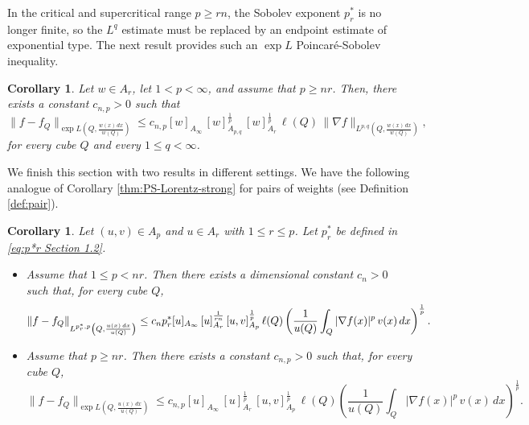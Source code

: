 \documentclass[reqno, 10pt, oneside]{amsart}
\numberwithin{equation}{section}
\newcommand{\strt}[1]{\rule{0pt}{#1}}
\newtheorem{corollary}[theorem]{Corollary}
\numberwithin{theorem}{section}
\newcommand{\1}{{\rm 1\hspace*{-0.4ex}%
\rule{0.1ex}{1.52ex}\hspace*{0.2ex}}}
\begin{document}
In the critical and supercritical range $p\ge rn$, the Sobolev exponent $p_r^{*}$ is no longer finite, so the $L^q$ estimate must be replaced by an endpoint estimate of exponential type. The next result provides such an $\exp L$ Poincaré-Sobolev inequality. 

\begin{corollary}\label{thm:PS-exp}
Let $w\in A_r$, let $1<p<\infty$, and assume that $p\ge nr$. Then, there exists a constant $c_{n,p}>0$ such that
\begin{equation}\label{eq:PS-exp}
	\|f-f_Q\|_{\exp L\left(Q, \frac{w(x)\,dx}{w(Q)}\right)} \le c_{n,p} [w]_{A_\infty}\,[w]_{A_{p,q}}^{\frac{1}{p}}\,[w]_{A_r}^{\frac{1}{p}}\, \ell(Q)\,\|\nabla f\|_{L^{p,q}\left(Q,\frac{w(x)\,dx}{w(Q)}\right)},
\end{equation}
for every cube $Q$ and every $1 \le q<\infty$.  
\end{corollary}



We finish this section with two results in different settings. We have the following analogue of Corollary \ref{thm:PS-Lorentz-strong} for pairs of weights (see Definition \ref{def:pair}).  


\begin{corollary}\label{prop:pairs}  
	Let $(u,v)\in A_p$ and $u\in A_r$ with $1\le r\le p$. Let $p_r^{*}$ be defined in \eqref{eq:p*r Section 1.2}.
	
	\begin{itemize}
		\item Assume that $1\le p < nr$. Then there exists a dimensional constant $c_n>0$ such that, for every cube $Q$,
		\begin{equation*}
			\|f-f_{Q}\|_{\strt{2.3ex} L^{p_r^{*},p}\left(Q, \frac{u(x)\,dx}{u(Q)}\right)} \le c_n p^*_r [u]_{A_\infty}\, [u]_{A_r}^{\frac{1}{rn}}\, [u,v]_{A_p}^{\frac{1}{p}}\, \ell(Q) \left( \frac{1}{u(Q)}\int_{Q}|\nabla f(x)|^p\, v(x)\,dx\right)^{\frac{1}{p}}.
		\end{equation*}
		
		\item Assume that $p \ge nr$. Then there exists a constant $c_{n,p}>0$ such that, for every cube $Q$,
		\begin{equation*}
			\|f-f_Q\|_{\exp L\left(Q, \frac{u(x)\,dx}{u(Q)}\right)} \le c_{n,p} [u]_{A_\infty}\,[u]_{A_r}^{\frac{1}{p}}\,[u,v]_{A_p}^{\frac{1}{p}}\, \ell(Q) \left( \frac{1}{u(Q)}\int_{Q}|\nabla f(x)|^p\, v(x)\,dx\right)^{\frac{1}{p}}.
		\end{equation*}
	\end{itemize}
\end{corollary} 
\
\end{document}

